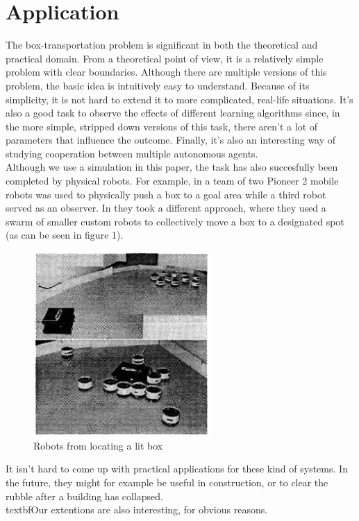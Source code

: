 \section{Application}
The box-transportation problem is significant in both the theoretical and practical domain. From a theoretical point of view, it is a relatively simple problem with clear boundaries. Although there are multiple versions of this problem, the basic idea is intuitively easy to understand. Because of its simplicity, it is not hard to extend it to more complicated, real-life situations. It's also a good task to observe the effects of different learning algorithms since, in the more simple, stripped down versions of this task, there aren't a lot of parameters that influence the outcome. Finally, it's also an interesting way of studying cooperation between multiple autonomous agents.\\
 Although we use a simulation in this paper, the task has also succesfully been completed by physical robots. For example, in \cite{mataric2002} a team of two Pioneer 2 mobile robots was used to physically push a box to a goal area while a third robot served as an observer. In \cite{kube1996} they took a different approach, where they used a swarm of smaller custom robots to collectively move a box to a designated spot (as can be seen in figure 1).
\begin{figure}[H]
\begin{center}
\caption{Robots from \cite{kube1996} locating a lit box}
\includegraphics[width = 0.6\textwidth]{images/swarmPushing.png}
\end{center}
\end{figure}
It isn't hard to come up with practical applications for these kind of systems. In the future, they might for example be useful in construction, or to clear the rubble after a building has collapsed.\\
textbf{Our extentions are also interesting, for obvious reasons.}
